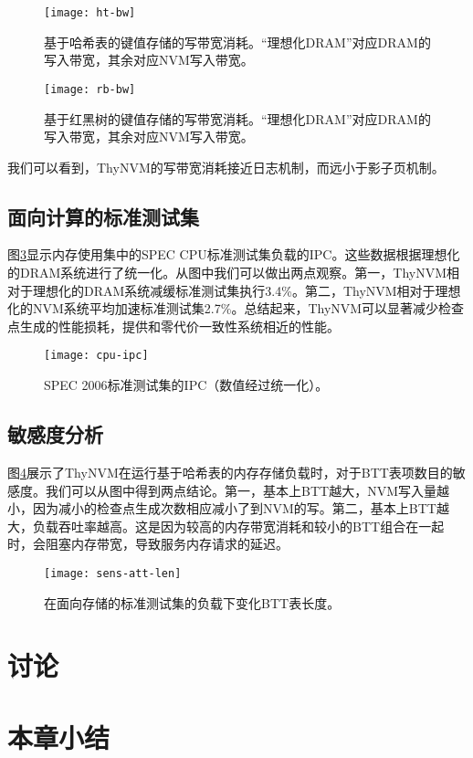 \begin{figure}[!h]
\centering
\texttt{[image: ht-bw]}\\
\caption{基于哈希表的键值存储的写带宽消耗。``理想化DRAM''对应DRAM的写入带宽，其余对应NVM写入带宽。}
\label{fig:ht-bw}
\end{figure}

\begin{figure}[!h]
\centering
\texttt{[image: rb-bw]}\\
\caption{基于红黑树的键值存储的写带宽消耗。``理想化DRAM''对应DRAM的写入带宽，其余对应NVM写入带宽。}
\label{fig:rb-bw}
\end{figure}

我们可以看到，ThyNVM的写带宽消耗接近日志机制，而远小于影子页机制。

\subsection{面向计算的标准测试集}

图\ref{fig:cpu-ipc}显示内存使用集中的SPEC CPU标准测试集负载的IPC。这些数据根据理想化的DRAM系统进行了统一化。从图中我们可以做出两点观察。第一，ThyNVM相对于理想化的DRAM系统减缓标准测试集执行3.4\%。第二，ThyNVM相对于理想化的NVM系统平均加速标准测试集2.7\%。总结起来，ThyNVM可以显著减少检查点生成的性能损耗，提供和零代价一致性系统相近的性能。
 
\begin{figure}[!h]
  \centering
  \texttt{[image: cpu-ipc]}
  \caption{SPEC 2006标准测试集的IPC（数值经过统一化）。}
  \label{fig:cpu-ipc}
\end{figure}
 
\subsection{敏感度分析}

图\ref{fig:sens-att-len}展示了ThyNVM在运行基于哈希表的内存存储负载时，对于BTT表项数目的敏感度。我们可以从图中得到两点结论。第一，基本上BTT越大，NVM写入量越小，因为减小的检查点生成次数相应减小了到NVM的写。第二，基本上BTT越大，负载吞吐率越高。这是因为较高的内存带宽消耗和较小的BTT组合在一起时，会阻塞内存带宽，导致服务内存请求的延迟。

\begin{figure}[!h]
  \centering
  \texttt{[image: sens-att-len]}
  \caption{在面向存储的标准测试集的负载下变化BTT表长度。}
  \label{fig:sens-att-len}
\end{figure}

\section{讨论}
\label{sec:thnvm-discuss}

\section{本章小结}


